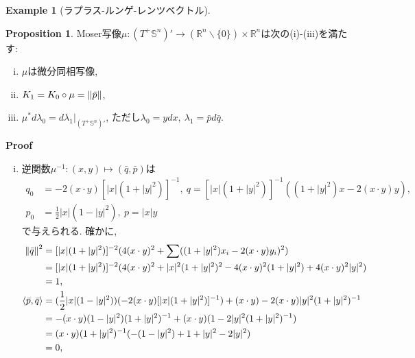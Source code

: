 \documentclass[a4paper]{ujarticle}
\makeatletter
\numberwithin{equation}{section}
\theoremstyle{definition}
\newtheorem{proposition}{Proposition}
\newtheorem{example}{Example}
\renewenvironment{proof}[1][Proof]{\par
  \pushQED{\qed}%
  \normalfont \topsep6\p@\@plus6\p@\relax
  \trivlist
  \item\relax
  {\bfseries
  #1\@addpunct{.}}\hspace\labelsep\ignorespaces
}{%
  \popQED\endtrivlist\@endpefalse
}
\makeatother
\begin{document}
\begin{example}[ラプラス-ルンゲ-レンツベクトル]
            \begin{proposition}
                Moser写像$\mu: (T^{+} \mathbb{S}^{n})' \rightarrow (\mathbb{R}^{n} \backslash \{0\}) \times \mathbb{R}^{n}$は次の(i)-(iii)を満たす:
                \begin{enumerate}[(i)]
                   \item $\mu$は微分同相写像,
                   \item $K_1 = K_0 \circ \mu = \norm{\bar{p}}$,
                   \item $\mu^{*} d \lambda_{0} = d \lambda_1 |_{(T^{+} \mathbb{S}^{n})'}$, ただし$\lambda_0 =  y d x, \ \lambda_1 = \bar{p} d \bar{q}$.
                \end{enumerate}
            \end{proposition}
            \begin{proof}
                \begin{enumerate}[(i)]
                    \item 逆関数$\mu^{-1}: (x, y) \mapsto (\bar{q}, \bar{p})$は
                    \begin{align}
                        q_0 &= - 2 (x \cdot y)[|x|(1 + |y|^2)]^{-1}, \ q = [|x|(1 + |y|^2)]^{-1}((1 + |y|^2)x - 2 (x \cdot y) y), \\
                        p_0 &= \frac{1}{2}|x|(1 - |y|^2), \ p = |x|y
                    \end{align}
                    で与えられる. 確かに,
                    \begin{align}
                        \norm{\bar{q}}^2 &= [|x|(1 + |y|^2)]^{-2}(4 (x \cdot y)^2 + \sum ((1 + |y|^2)x_i - 2 (x \cdot y) y_i)^2 )\\
                        &= [|x|(1 + |y|^2)]^{-2}(4 (x \cdot y)^2 + |x|^2(1 + |y|^2)^2 - 4(x \cdot y)^2 (1 + |y|^2) + 4 (x \cdot y)^2 |y|^2  ) \\
                        &= 1, \\
                        \langle \bar{p}, \bar{q}\rangle &= (\frac{1}{2}|x|(1 - |y|^2)) (- 2 (x \cdot y)[|x|(1 + |y|^2)]^{-1}) + (x \cdot y) - 2 (x \cdot y)|y|^2(1 + |y|^2)^{-1} \\
                        &=  - (x \cdot y)(1 - |y|^2)(1 + |y|^2)^{-1} + (x \cdot y) (1 - 2|y|^2(1 + |y|^2)^{-1}) \\
                        &= (x \cdot y)(1 + |y|^2)^{-1}(- (1 - |y|^2) + 1 + |y|^2 - 2 |y|^2)\\
                        &= 0, \\

\end{align}
\end{enumerate}
\end{proof}
\end{example}
\end{document}
